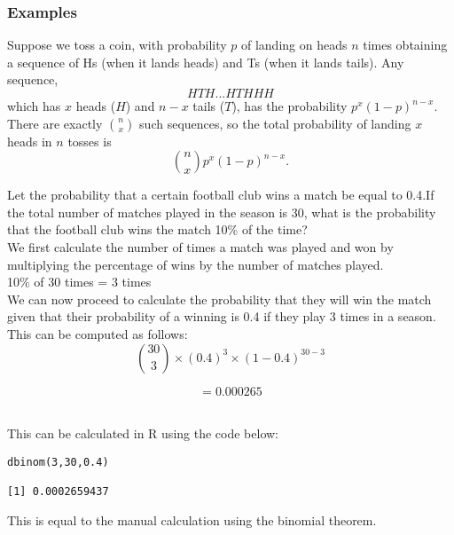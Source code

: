 \documentclass[12pt,a4paper]{article}
\theoremstyle{regla}
\theoremstyle{remark}
\theoremstyle{definition}
\theoremstyle{nonumberbreak}
\begin{document}
\subsubsection{Examples}
\begin{xmpl} 
Suppose we toss a coin, with probability $p$ of landing on heads $n$ times obtaining a sequence of Hs (when it lands heads) and Ts (when it lands tails). Any sequence, 
$$
HTH...HTHHH
$$
which has $x$ heads ($H$) and $n-x$ tails ($T$), has the probability $p^x(1-p)^{n-x}$. There are exactly $\binom{n}{x}$ such sequences, so the total probability of landing $x$ heads in $n$ tosses is
$$
\binom{n}{x}p^x(1-p)^{n-x}.
$$

\end{xmpl} 
\begin{xmpl} 


Let the probability that a certain football club wins a match be equal to 0.4.If the total number of matches played in the season is 30, what is the probability that the football club wins the match 10\% of the time?\\

We first calculate the number of times a match was played and won by multiplying the percentage of wins by the number of matches played.\\

10\% of 30 times = 3 times\\

We can now proceed to calculate the probability that they will win the match given that their probability of a winning is 0.4 if they play 3 times in a season. This can be computed as follows:\\

$$\binom{30}{3} \times (0.4)^3 \times (1-0.4)^{30-3} $$

$$=0.000265$$

\\
This can be calculated in R using the code below:
\begin{lstlisting}
dbinom(3,30,0.4)

[1] 0.0002659437
\end{lstlisting}
This is equal to the manual calculation using the binomial theorem.


\end{xmpl} 
\end{document}
